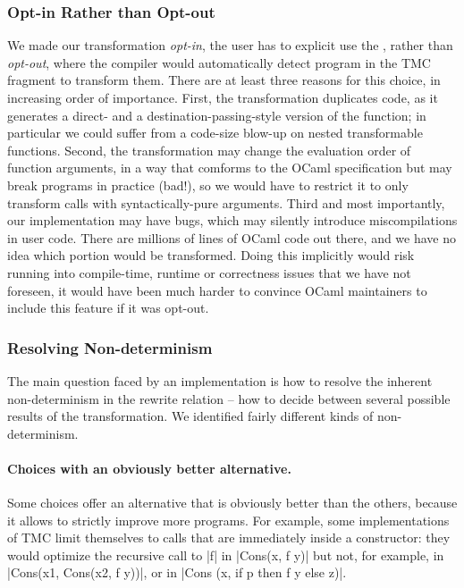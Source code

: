 \subsubsection{Opt-in Rather than Opt-out} We made our transformation
\emph{opt-in}, the user has to explicit use the
, rather than \emph{opt-out}, where the
compiler would automatically detect program in the TMC fragment to
transform them. There are at least three reasons for this choice, in
increasing order of importance. First, the transformation duplicates
code, as it generates a direct- and a destination-passing-style
version of the function; in particular we could suffer from
a code-size blow-up on nested transformable functions. Second, the
transformation may change the evaluation order of function arguments,
in a way that comforms to the OCaml specification but may break
programs in practice (bad!), so we would have to restrict it to only
transform calls with syntactically-pure arguments. Third and most
importantly, our implementation may have bugs, which may silently
introduce miscompilations in user code. There are millions of lines of
OCaml code out there, and we have no idea which portion would be
transformed. Doing this implicitly would risk running into
compile-time, runtime or correctness issues that we have not foreseen,
it would have been much harder to convince OCaml maintainers to
include this feature if it was opt-out.

\subsubsection{Resolving Non-determinism}

The main question faced by an implementation is how to resolve the
inherent non-determinism in the rewrite relation -- how to decide
between several possible results of the transformation. We identified
fairly different kinds of non-determinism.

\paragraph{Choices with an obviously better alternative.}
Some choices offer an alternative that is obviously better than the others, because it allows to strictly improve more programs. For example, some implementations of TMC limit themselves to calls that are immediately inside a constructor: they would optimize the recursive call to \ocaml|f| in \ocaml|Cons(x, f y)| but not, for example, in \ocaml|Cons(x1, Cons(x2, f y))|, or in \ocaml|Cons (x, if p then f y else z)|.

